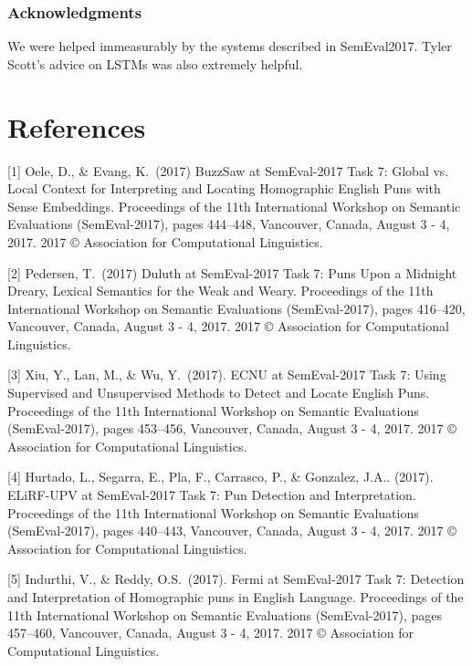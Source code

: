 \documentclass{article}
\begin{document}
\subsubsection*{Acknowledgments}

We were helped immeasurably by the systems described in SemEval2017. Tyler
Scott's advice on LSTMs was also extremely helpful.

\section*{References}

\medskip

\small

[1] Oele, D., \& Evang, K.\ (2017) BuzzSaw at SemEval-2017 Task 7:
Global vs. Local Context for Interpreting and Locating Homographic English Puns
with Sense Embeddings. Proceedings of the 11th International Workshop on
Semantic Evaluations (SemEval-2017), pages 444–448, Vancouver, Canada, August 3
- 4, 2017. 2017 © Association for Computational Linguistics.

[2] Pedersen, T.\ (2017) Duluth at SemEval-2017 Task 7: Puns Upon a Midnight
Dreary, Lexical Semantics for the Weak and Weary. Proceedings of the 11th
International Workshop on Semantic Evaluations (SemEval-2017), pages 416–420,
Vancouver, Canada, August 3 - 4, 2017. 2017 © Association for Computational
Linguistics.

[3] Xiu, Y., Lan, M., \& Wu, Y.\ (2017). ECNU at SemEval-2017 Task 7: Using
Supervised and Unsupervised Methods to Detect and Locate English Puns.
Proceedings of the 11th International Workshop on Semantic Evaluations
(SemEval-2017), pages 453–456, Vancouver, Canada, August 3 - 4, 2017. 2017 ©
Association for Computational Linguistics.

[4] Hurtado, L., Segarra, E., Pla, F., Carrasco, P., \& Gonzalez, J.A..
(2017). ELiRF-UPV at SemEval-2017 Task 7: Pun Detection and Interpretation.
Proceedings of the 11th International Workshop on Semantic Evaluations
(SemEval-2017), pages 440–443, Vancouver, Canada, August 3 - 4,
2017. 2017 © Association for Computational Linguistics.

[5] Indurthi, V., \&  Reddy, O.S.\ (2017). Fermi at SemEval-2017 Task
7: Detection and Interpretation of Homographic puns in English Language.
Proceedings of the 11th International Workshop on Semantic Evaluations
(SemEval-2017), pages 457–460, Vancouver, Canada, August 3 - 4, 2017. 2017 ©
Association for Computational Linguistics.
\end{document}
